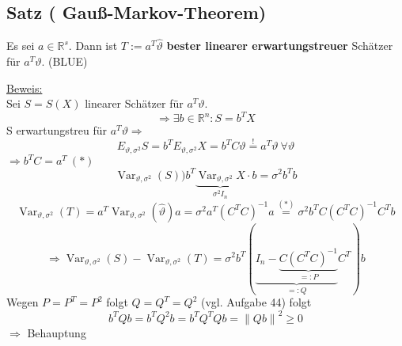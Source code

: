 \documentclass[a4paper,11pt,twoside,titlepage]{article}
\newcommand{\R}{{\mathbb R}}
\DeclareMathOperator{\var}{Var}
\begin{document}
\subsection{Satz ( Gauß-Markov-Theorem)}
Es sei $a\in\R^s$. Dann ist $T:=a^T\hat\vartheta$ \textbf{bester linearer erwartungstreuer} Schätzer für $a^T\vartheta$. (BLUE)

\underline{Beweis:}\\
Sei $S=S(X)$ linearer Schätzer für $a^T\vartheta$.
\[\Rightarrow\exists b\in\R^n:S=b^TX\]
S erwartungstreu für $a^T\vartheta\Rightarrow$\[ E_{\vartheta,\sigma^2}S=b^TE_{\vartheta,\sigma^2}X=
b^TC\vartheta\stackrel{!}{=}a^T\vartheta\ \forall\vartheta\]
$\Rightarrow b^TC=a^T\ (\ast)$
$$\var_{\vartheta,\sigma^2}(S))b^T\underbrace{\var_{\vartheta,\sigma^2}X}_{\sigma^2I_n}\cdot b=\sigma^2b^Tb$$
$$\var_{\vartheta,\sigma^2}(T)=a^T\var_{\vartheta,\sigma^2}(\hat\vartheta)a=\sigma^2a^T(C^TC)^{-1}a\stackrel{(\ast)}{=}
\sigma^2b^TC(C^TC)^{-1}C^Tb$$
$$\Rightarrow\var_{\vartheta,\sigma^2}(S)-\var_{\vartheta,\sigma^2}(T)=\sigma^2b^T(\underbrace{I_n-\underbrace{C(C^TC)^{-1}}_{=:P}}_{=:Q}C^T)b$$
Wegen $P=P^T=P^2$ folgt $Q=Q^T=Q^2$ (vgl. Aufgabe 44) folgt
$$b^TQb=b^TQ^2b=b^TQ^TQb=\left\|Qb\right\|^2\geq 0$$
$\Rightarrow$ Behauptung
\end{document}
